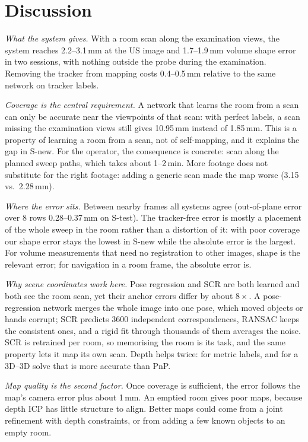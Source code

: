 \documentclass[journal]{IEEEtran}
\newcommand{\Stest}{S-test}
\newcommand{\Snew}{S-new}
\begin{document}
\section{Discussion}
\label{sec:discussion}

\emph{What the system gives.} With a room scan along the examination views, the system reaches 2.2--3.1\,mm at the US image and 1.7--1.9\,mm volume shape error in two sessions, with nothing outside the probe during the examination. Removing the tracker from mapping costs 0.4--0.5\,mm relative to the same network on tracker labels.

\emph{Coverage is the central requirement.} A network that learns the room from a scan can only be accurate near the viewpoints of that scan: with perfect labels, a scan missing the examination views still gives 10.95\,mm instead of 1.85\,mm. This is a property of learning a room from a scan, not of self-mapping, and it explains the gap in \Snew{}. For the operator, the consequence is concrete: scan along the planned sweep paths, which takes about 1--2\,min. More footage does not substitute for the right footage: adding a generic scan made the map worse (3.15 vs.\ 2.28\,mm).

\emph{Where the error sits.} Between nearby frames all systems agree (out-of-plane error over 8 rows 0.28--0.37\,mm on \Stest{}). The tracker-free error is mostly a placement of the whole sweep in the room rather than a distortion of it: with poor coverage our shape error stays the lowest in \Snew{} while the absolute error is the largest. For volume measurements that need no registration to other images, shape is the relevant error; for navigation in a room frame, the absolute error is.

\emph{Why scene coordinates work here.} Pose regression and SCR are both learned and both see the room scan, yet their anchor errors differ by about $8\times$. A pose-regression network merges the whole image into one pose, which moved objects or hands corrupt; SCR predicts 3600 independent correspondences, RANSAC keeps the consistent ones, and a rigid fit through thousands of them averages the noise. SCR is retrained per room, so memorising the room is its task, and the same property lets it map its own scan. Depth helps twice: for metric labels, and for a 3D--3D solve that is more accurate than PnP.

\emph{Map quality is the second factor.} Once coverage is sufficient, the error follows the map's camera error plus about 1\,mm. An emptied room gives poor maps, because depth ICP has little structure to align. Better maps could come from a joint refinement with depth constraints, or from adding a few known objects to an empty room.
\end{document}
